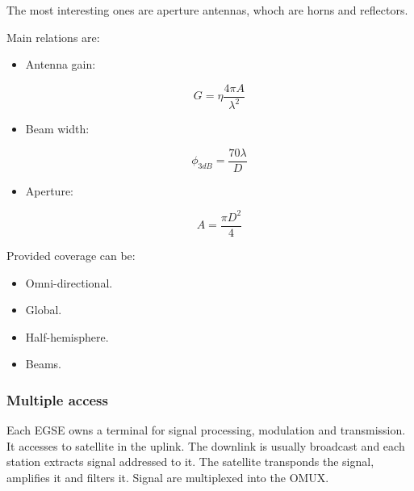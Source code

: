 \documentclass[
	12pt,
	twoside
]{book}
\begin{document}
The most interesting ones are aperture antennas, whoch are horns and reflectors.

Main relations are:

\begin{itemize}
	\item {
		Antenna gain:

		$$
			G = \eta \frac {4 \pi A} {\lambda^2}
		$$
	}
	\item {
		Beam width:

		$$
			\phi_{3dB} = \frac {70 \lambda} {D}
		$$
	}
	\item {
		Aperture:

		$$
			A = \frac {\pi D^2} {4}
		$$
	}
\end{itemize}

Provided coverage can be:
\begin{itemize}
	\item Omni-directional.
	\item Global.
	\item Half-hemisphere.
	\item Beams.
\end{itemize}

\subsubsection{Multiple access}

Each EGSE owns a terminal for signal processing, modulation and transmission. It accesses to satellite in the uplink. The downlink is usually broadcast and each station extracts signal addressed to it. The satellite transponds the signal, amplifies it and filters it. Signal are multiplexed into the OMUX.
\end{document}
